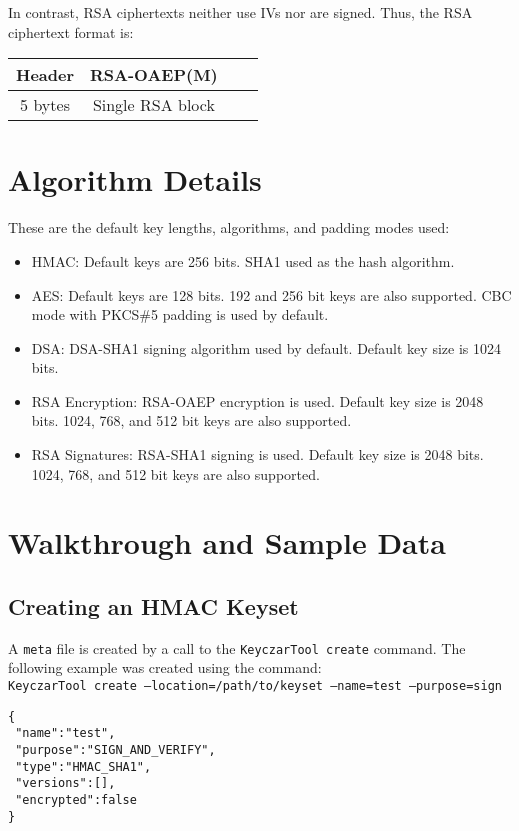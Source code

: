 \documentclass{llncs}
\begin{document}
In contrast, RSA ciphertexts neither use IVs nor are signed. Thus, the RSA
ciphertext format is:

\vspace*{3mm}
\begin{tabular}{| c | c | c | c |}
\hline
Header & RSA-OAEP(M)  \\ \hline
5 bytes & Single RSA block  \\
\hline
\end{tabular}
\vspace*{3mm}

\section{Algorithm Details}

These are the default key lengths, algorithms, and padding modes used:

\begin{itemize}
  \item HMAC: Default keys are 256 bits. SHA1 used as the hash
  algorithm.
  \item AES: Default keys are 128 bits. 192 and 256 bit keys are also supported.
  CBC mode with PKCS\#5 padding is used by default.
  \item DSA: DSA-SHA1 signing algorithm used by default. Default key size is
  1024 bits.
  \item RSA Encryption: RSA-OAEP encryption is used. Default key size is 2048
  bits. 1024, 768, and 512 bit keys are also supported.
  \item RSA Signatures: RSA-SHA1 signing is used. Default key size is 2048
  bits. 1024, 768, and 512 bit keys are also supported.
\end{itemize}


\section{Walkthrough and Sample Data}\label{walkthrough}

\subsection{Creating an HMAC Keyset}
A {\tt meta} file is created by a call to the {\tt KeyczarTool create} command.
The following example was created using the command: \\
{\tt KeyczarTool create --location=/path/to/keyset --name=test --purpose=sign}

\begin{verbatim}
{
 "name":"test",
 "purpose":"SIGN_AND_VERIFY",
 "type":"HMAC_SHA1",
 "versions":[],
 "encrypted":false
}
\end{verbatim}
\end{document}
